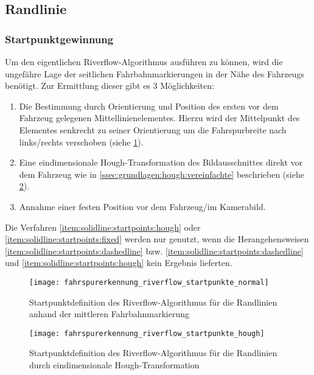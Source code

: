 \subsection{Randlinie} \label{ssec:fahrspurerkennung:riverflow:randlinie}
\subsubsection{Startpunktgewinnung}
Um den eigentlichen Riverflow-Algorithmus ausführen zu können, wird die ungefähre Lage der seitlichen Fahrbahnmarkierungen in der Nähe des Fahrzeugs benötigt. Zur Ermittlung dieser gibt es 3 Möglichkeiten:
\begin{enumerate}
\item \label{item:solidline:startpoints:dashedline}
Die Bestimmung durch Orientierung und Position des ersten vor dem Fahrzeug gelegenen Mittellinienelementes. Hierzu wird der Mittelpunkt des Elementes senkrecht zu seiner Orientierung um die Fahrspurbreite nach links/rechts verschoben (siehe \ref{fig:riverflow:randlinien:startpoints:dashedline}).
\item \label{item:solidline:startpoints:hough}
Eine eindimensionale Hough-Transformation des Bildausschnittes direkt vor dem Fahrzeug wie in \ref{ssec:grundlagen:hough:vereinfachte} beschrieben (siehe \ref{fig:riverflow:randlinien:startpoints:hough}). 
\item \label{item:solidline:startpoints:fixed}
Annahme einer festen Position vor dem Fahrzeug/im Kamerabild.
\end{enumerate}

Die Verfahren \ref{item:solidline:startpoints:hough} oder \ref{item:solidline:startpoints:fixed} werden nur genutzt, wenn die Herangehensweisen \ref{item:solidline:startpoints:dashedline} bzw. \ref{item:solidline:startpoints:dashedline} und \ref{item:solidline:startpoints:hough} kein Ergebnis lieferten.

\begin{figure}[H]
	\centering
	\texttt{[image: fahrspurerkennung\_riverflow\_startpunkte\_normal]}
	\caption{Startpunktdefinition des Riverflow-Algorithmus für die Randlinien anhand der mittleren Fahrbahnmarkierung}
	\label{fig:riverflow:randlinien:startpoints:dashedline}
\end{figure}

\begin{figure}[H]
	\centering
	\texttt{[image: fahrspurerkennung\_riverflow\_startpunkte\_hough]}
	\caption{Startpunktdefinition des Riverflow-Algorithmus für die Randlinien durch eindimensionale Hough-Transformation}
	\label{fig:riverflow:randlinien:startpoints:hough}
\end{figure}


